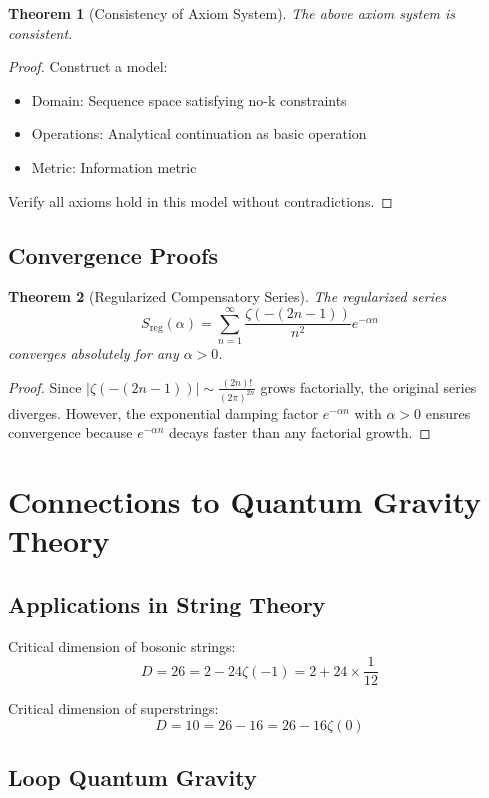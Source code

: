 \documentclass[12pt]{article}
\newtheorem{theorem}{Theorem}[section]
\begin{document}
\begin{theorem}[Consistency of Axiom System]
The above axiom system is consistent.
\end{theorem}

\begin{proof}
Construct a model:
\begin{itemize}
\item Domain: Sequence space satisfying no-k constraints
\item Operations: Analytical continuation as basic operation
\item Metric: Information metric
\end{itemize}

Verify all axioms hold in this model without contradictions.
\end{proof}

\subsection{Convergence Proofs}

\begin{theorem}[Regularized Compensatory Series]
The regularized series
$$S_{\text{reg}}(\alpha) = \sum_{n=1}^{\infty} \frac{\zeta(-(2n-1))}{n^2} e^{-\alpha n}$$
converges absolutely for any $\alpha > 0$.
\end{theorem}

\begin{proof}
Since $|\zeta(-(2n-1))| \sim \frac{(2n)!}{(2\pi)^{2n}}$ grows factorially, the original series diverges. However, the exponential damping factor $e^{-\alpha n}$ with $\alpha > 0$ ensures convergence because $e^{-\alpha n}$ decays faster than any factorial growth.
\end{proof}

\section{Connections to Quantum Gravity Theory}

\subsection{Applications in String Theory}

Critical dimension of bosonic strings:
$$D = 26 = 2 - 24\zeta(-1) = 2 + 24 \times \frac{1}{12}$$

Critical dimension of superstrings:
$$D = 10 = 26 - 16 = 26 - 16\zeta(0)$$

\subsection{Loop Quantum Gravity}
\end{document}
